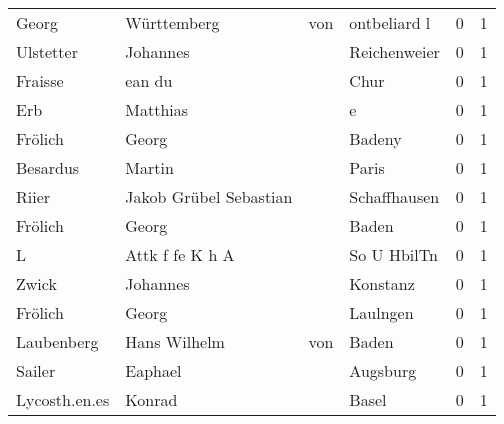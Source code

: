 \documentclass[10pt,a4paper,landscape]{article}
\begin{document}
\begin{longtable}{llllrr}
                    Georg &                        Württemberg &         von &                                ontbeliard l &          0 &         1 \\
                Ulstetter &                           Johannes &             &                                Reichenweier &          0 &         1 \\
                  Fraisse &                             ean du &             &                                        Chur &          0 &         1 \\
                      Erb &                           Matthias &             &                                           e &          0 &         1 \\
                  Frölich &                              Georg &             &                                      Badeny &          0 &         1 \\
                 Besardus &                             Martin &             &                                       Paris &          0 &         1 \\
                    Riier &             Jakob Grübel Sebastian &             &                                Schaffhausen &          0 &         1 \\
                  Frölich &                              Georg &             &                                       Baden &          0 &         1 \\
                        L &                    Attk f fe K h A &             &                                 So U HbilTn &          0 &         1 \\
                    Zwick &                           Johannes &             &                                    Konstanz &          0 &         1 \\
                  Frölich &                              Georg &             &                                    Laulngen &          0 &         1 \\
               Laubenberg &                       Hans Wilhelm &         von &                                       Baden &          0 &         1 \\
                   Sailer &                            Eaphael &             &                                    Augsburg &          0 &         1 \\
            Lycosth.en.es &                             Konrad &             &                                       Basel &          0 &         1 \\

\end{longtable}
\end{document}

